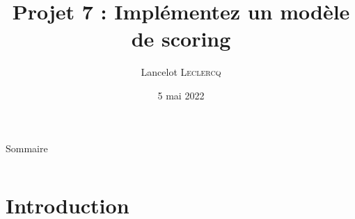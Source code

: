 \documentclass[8pt,aspectratio=169,hyperref={unicode=true}]{beamer}
\title[Implémentez un modèle de scoring]{Projet 7 : Implémentez un modèle de scoring}
\author[Lancelot \textsc{Leclercq}]{Lancelot \textsc{Leclercq}}
\institute[]{}
\date[]{\small{5 mai 2022}}
\begin{document}
\begin{frame}[plain]
    \titlepage
\end{frame}

\begin{frame}{Sommaire}
    \Large
    \begin{columns}
        \begin{column}{.7\textwidth}
            \tableofcontents[hideallsubsections]
        \end{column}
    \end{columns}
\end{frame}

\section{Introduction}
\end{document}
